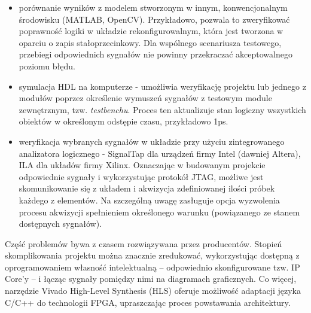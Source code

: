 \begin{itemize}
	\item porównanie wyników z modelem stworzonym w innym, konwencjonalnym środowisku (MATLAB, OpenCV). Przykładowo, pozwala to zweryfikować poprawność logiki w układzie rekonfigurowalnym, która jest tworzona w oparciu o zapis stałoprzecinkowy. Dla wspólnego scenariusza testowego, przebiegi odpowiednich sygnałów nie powinny przekraczać akceptowalnego poziomu błędu.
	\item symulacja HDL na komputerze - umożliwia weryfikację projektu lub jednego z modułów poprzez określenie wymuszeń sygnałów z testowym module zewnętrznym, tzw. \textit{testbenchu}. Proces ten aktualizuje stan logiczny wszystkich obiektów w określonym odstępie czasu, przykładowo 1ps.
	\item weryfikacja wybranych sygnałów w układzie przy użyciu zintegrowanego analizatora logicznego -  SignalTap dla urządzeń firmy Intel (dawniej Altera), ILA dla układów firmy Xilinx. Oznaczając w budowanym projekcie odpowiednie sygnały i wykorzystując protokół JTAG, możliwe jest skomunikowanie się z układem i akwizycja zdefiniowanej ilości próbek każdego z elementów. Na szczególną uwagę zasługuje opcja wyzwolenia procesu akwizycji spełnieniem określonego warunku (powiązanego ze stanem dostępnych sygnałów).  %
\end{itemize}

Część problemów bywa z czasem rozwiązywana przez producentów. 
Stopień skomplikowania projektu można znacznie zredukować, wykorzystując dostępną z oprogramowaniem własność intelektualną -- odpowiednio skonfigurowane tzw. IP Core'y -- i łącząc sygnały pomiędzy nimi na diagramach graficznych. 
Co więcej, narzędzie Vivado High-Level Synthesis (HLS) oferuje możliwość adaptacji języka C/C++ do technologii FPGA, upraszczając proces powstawania architektury. 

